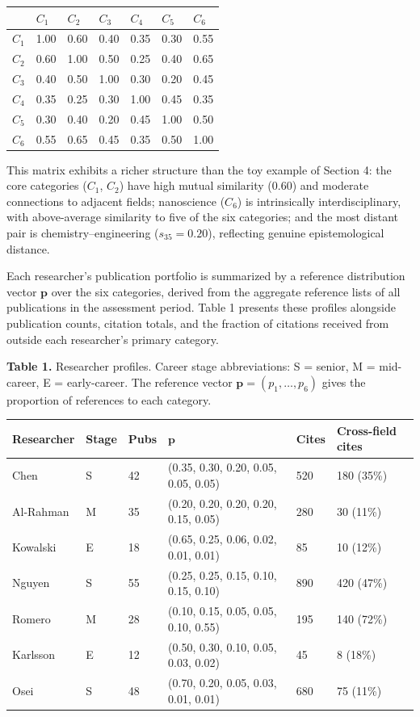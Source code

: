 \documentclass[
]{article}
\begin{document}
\begin{longtable}[]{@{}lllllll@{}}
\toprule
& \(C_1\) & \(C_2\) & \(C_3\) & \(C_4\) & \(C_5\) & \(C_6\) \\
\midrule
\endhead
\(C_1\) & 1.00 & 0.60 & 0.40 & 0.35 & 0.30 & 0.55 \\
\(C_2\) & 0.60 & 1.00 & 0.50 & 0.25 & 0.40 & 0.65 \\
\(C_3\) & 0.40 & 0.50 & 1.00 & 0.30 & 0.20 & 0.45 \\
\(C_4\) & 0.35 & 0.25 & 0.30 & 1.00 & 0.45 & 0.35 \\
\(C_5\) & 0.30 & 0.40 & 0.20 & 0.45 & 1.00 & 0.50 \\
\(C_6\) & 0.55 & 0.65 & 0.45 & 0.35 & 0.50 & 1.00 \\
\bottomrule
\end{longtable}

This matrix exhibits a richer structure than the toy example of Section
4: the core categories (\(C_1\), \(C_2\)) have high mutual similarity
(0.60) and moderate connections to adjacent fields; nanoscience
(\(C_6\)) is intrinsically interdisciplinary, with above-average
similarity to five of the six categories; and the most distant pair is
chemistry--engineering (\(s_{35} = 0.20\)), reflecting genuine
epistemological distance.

Each researcher's publication portfolio is summarized by a reference
distribution vector \(\mathbf{p}\) over the six categories, derived from
the aggregate reference lists of all publications in the assessment
period. Table 1 presents these profiles alongside publication counts,
citation totals, and the fraction of citations received from outside
each researcher's primary category.

\textbf{Table 1.} Researcher profiles. Career stage abbreviations: S =
senior, M = mid-career, E = early-career. The reference vector
\(\mathbf{p} = (p_1, \ldots, p_6)\) gives the proportion of references
to each category.

\begin{longtable}[]{@{}llllll@{}}
\toprule
Researcher & Stage & Pubs & \(\mathbf{p}\) & Cites & Cross-field
cites \\
\midrule
\endhead
Chen & S & 42 & (0.35, 0.30, 0.20, 0.05, 0.05, 0.05) & 520 & 180
(35\%) \\
Al-Rahman & M & 35 & (0.20, 0.20, 0.20, 0.20, 0.15, 0.05) & 280 & 30
(11\%) \\
Kowalski & E & 18 & (0.65, 0.25, 0.06, 0.02, 0.01, 0.01) & 85 & 10
(12\%) \\
Nguyen & S & 55 & (0.25, 0.25, 0.15, 0.10, 0.15, 0.10) & 890 & 420
(47\%) \\
Romero & M & 28 & (0.10, 0.15, 0.05, 0.05, 0.10, 0.55) & 195 & 140
(72\%) \\
Karlsson & E & 12 & (0.50, 0.30, 0.10, 0.05, 0.03, 0.02) & 45 & 8
(18\%) \\
Osei & S & 48 & (0.70, 0.20, 0.05, 0.03, 0.01, 0.01) & 680 & 75
(11\%) \\
\bottomrule
\end{longtable}
\end{document}
